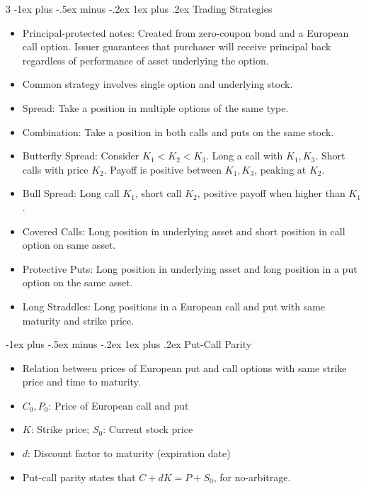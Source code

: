 \documentclass[10pt, landscape]{article}
\makeatletter
\renewcommand{\subsection}{\@startsection{subsection}{3}{0mm}%
                                {-1ex plus -.5ex minus -.2ex}%
                                {1ex plus .2ex}%
                                {\normalfont\small\bfseries}}%
\makeatother
\begin{document}
\begin{multicols*}{3}
\subsection{Trading Strategies}
\begin{itemize}
    \item Principal-protected notes: Created from zero-coupon bond and a European call option. Issuer guarantees that purchaser will receive principal back regardless of performance of asset underlying the option.
    \item Common strategy involves single option and underlying stock.
    \item Spread: Take a position in multiple options of the same type.
    \item Combination: Take a position in both calls and puts on the same stock.
    \item Butterfly Spread: Consider $K_1<K_2<K_3$. Long a call with $K_1, K_3$. Short calls with price $K_2$. Payoff is positive between $K_1, K_3$, peaking at $K_2$.
    \item Bull Spread: Long call $K_1$, short call $K_2$, positive payoff when higher than $K_1$.
    \item Covered Calls: Long position in underlying asset and short position in call option on same asset.
    \item Protective Puts: Long position in underlying asset and long position in a put option on the same asset.
    \item Long Straddles: Long positions in a European call and put with same maturity and strike price.
\end{itemize}

\subsection{Put-Call Parity}
\begin{itemize}
    \item Relation between prices of European put and call options with same strike price and time to maturity.
    \item $C_0, P_0$: Price of European call and put
    \item $K$: Strike price; $S_0$: Current stock price
    \item $d$: Discount factor to maturity (expiration date)
    \item Put-call parity states that $C+dK=P+S_0$, for no-arbitrage.
\end{itemize}


\end{multicols*}
\end{document}
